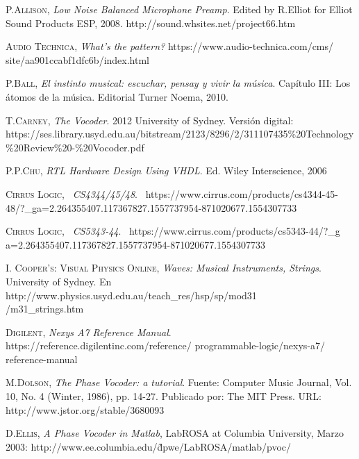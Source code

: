 \documentclass[a4paper, 11pt, oneside, openright]{report}
\begin{document}
\begin{thebibliography}{aa}


	\textsc{P.Allison},
	\textit{Low Noise Balanced Microphone Preamp}.
	Edited by R.Elliot for	
	Elliot Sound Products ESP, 2008.
	http://sound.whsites.net/project66.htm
	
	\textsc{Audio Technica},
	\textit{What's the pattern?}
	https://www.audio-technica.com/cms/ site/aa901ccabf1dfc6b/index.html
	
	\textsc{P.Ball},
	\textit{El instinto musical: escuchar, pensay y vivir la música}. Capítulo III: Los átomos de la música. Editorial Turner Noema, 2010.
	
	\textsc{T.Carney},
	\textit{The Vocoder}. 2012 University of Sydney. Versión digital:
	https://ses.library.usyd.edu.au/bitstream/2123/8296/2/311107435\%20Technology\\\%20Review\%20-\%20Vocoder.pdf
	
	\textsc{P.P.Chu},
	\textit{RTL Hardware Design Using VHDL}.
	Ed. Wiley Interscience, 2006
	
	\textsc{Cirrus Logic},~
	\textit{CS4344/45/48}.~
	https://www.cirrus.com/products/cs4344-45-48/?\_ga=2.264355407.117367827.1557737954-871020677.1554307733
	
	\textsc{Cirrus Logic},~
	\textit{CS5343-44}.~
	https://www.cirrus.com/products/cs5343-44/?\_g a=2.264355407.117367827.1557737954-871020677.1554307733
	
	\textsc{I. Cooper's: Visual Physics Online},
	\textit{Waves: Musical Instruments, Strings}. University of Sydney. En
	http://www.physics.usyd.edu.au/teach\_res/hsp/sp/mod31\\/m31\_strings.htm
	
	\textsc{Digilent},
	\textit{Nexys A7 Reference Manual}.
	https://reference.digilentinc.com/reference/ programmable-logic/nexys-a7/	  reference-manual
	
	\textsc{M.Dolson},
	\textit{The Phase Vocoder: a tutorial}.
	Fuente: Computer Music Journal, Vol. 10, No. 4 (Winter, 1986), pp. 14-27. Publicado por: The MIT Press. URL: 		    http://www.jstor.org/stable/3680093
	
	\textsc{D.Ellis},
	\textit{A Phase Vocoder in Matlab},
	LabROSA at Columbia University,
	Marzo 2003: 
	http://www.ee.columbia.edu/\~dpwe/LabROSA/matlab/pvoc/
	

\end{thebibliography}
\end{document}
